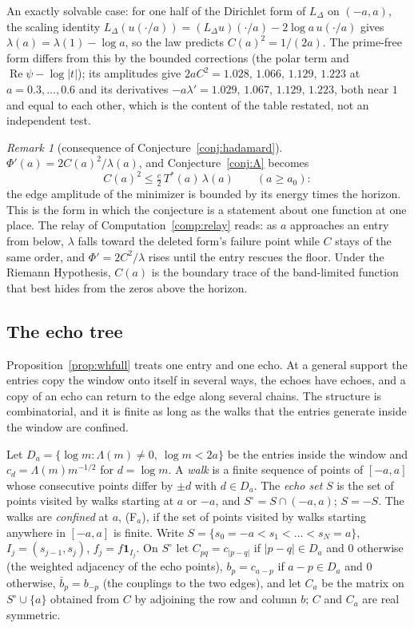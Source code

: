 \documentclass[11pt]{article}
\theoremstyle{definition}
\theoremstyle{remark}
\newtheorem{remark}[theorem]{Remark}
\DeclareMathOperator{\Ree}{Re}
\newcommand{\Tst}{T^{*}}
\begin{document}
An exactly solvable case: for one half of the Dirichlet form of $L_\Delta$ on $(-a,a)$, the scaling identity $L_\Delta(u(\cdot/a))=(L_\Delta u)(\cdot/a)-2\log a\,u(\cdot/a)$ gives $\lambda(a)=\lambda(1)-\log a$, so the law predicts $C(a)^2=1/(2a)$. The prime-free form differs from this by the bounded corrections (the polar term and $\Ree\psi-\log|t|$); its amplitudes give $2aC^2=1.028,\,1.066,\,1.129,\,1.223$ at $a=0.3,\dots,0.6$ and its derivatives $-a\lambda'=1.029,\,1.067,\,1.129,\,1.223$, both near $1$ and equal to each other, which is the content of the table restated, not an independent test.

\begin{remark}[consequence of Conjecture~\ref{conj:hadamard}]
$\Phi'(a)=2C(a)^2/\lambda(a)$, and Conjecture~\ref{conj:A} becomes
\[
C(a)^2\le\tfrac{c}{2}\,\Tst(a)\,\lambda(a)\qquad(a\ge a_0):
\]
the edge amplitude of the minimizer is bounded by its energy times the horizon. This is the form in which the conjecture is a statement about one function at one place. The relay of Computation~\ref{comp:relay} reads: as $a$ approaches an entry from below, $\lambda$ falls toward the deleted form's failure point while $C$ stays of the same order, and $\Phi'=2C^2/\lambda$ rises until the entry rescues the floor. Under the Riemann Hypothesis, $C(a)$ is the boundary trace of the band-limited function that best hides from the zeros above the horizon.
\end{remark}


\subsection{The echo tree}\label{sec:tree}

Proposition~\ref{prop:whfull} treats one entry and one echo. At a general support the entries copy the window onto itself in several ways, the echoes have echoes, and a copy of an echo can return to the edge along several chains. The structure is combinatorial, and it is finite as long as the walks that the entries generate inside the window are confined.

Let $D_a=\{\log m:\Lambda(m)\ne0,\ \log m<2a\}$ be the entries inside the window and $c_d=\Lambda(m)m^{-1/2}$ for $d=\log m$. A \emph{walk} is a finite sequence of points of $[-a,a]$ whose consecutive points differ by $\pm d$ with $d\in D_a$. The \emph{echo set} $S$ is the set of points visited by walks starting at $a$ or $-a$, and $S^\circ=S\cap(-a,a)$; $S=-S$. The walks are \emph{confined} at $a$, (F$_a$), if the set of points visited by walks starting anywhere in $[-a,a]$ is finite. Write $S=\{s_0=-a<s_1<\dots<s_N=a\}$, $I_j=(s_{j-1},s_j)$, $f_j=f\mathbf 1_{I_j}$. On $S^\circ$ let $C_{pq}=c_{|p-q|}$ if $|p-q|\in D_a$ and $0$ otherwise (the weighted adjacency of the echo points), $b_p=c_{a-p}$ if $a-p\in D_a$ and $0$ otherwise, $\bar b_p=b_{-p}$ (the couplings to the two edges), and let $C_a$ be the matrix on $S^\circ\cup\{a\}$ obtained from $C$ by adjoining the row and column $b$; $C$ and $C_a$ are real symmetric.
\end{document}
